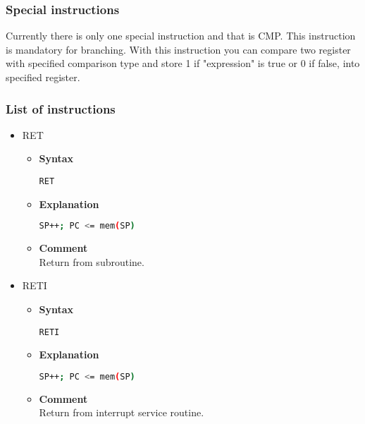 \subsubsection{Special instructions}

Currently there is only one special instruction and that is CMP. This
instruction is mandatory for branching. With this instruction you can compare
two register with specified comparison type and store 1 if "expression" is true
or 0 if false, into specified register.

\subsubsection{List of instructions}

\begin{itemize}

    \item RET
    \begin{itemize}
        \item \textbf{Syntax}
        \begin{lstlisting}[language={[x86masm]Assembler}, frame=single]
    RET
        \end{lstlisting}
        \item \textbf{Explanation}
        \begin{lstlisting}[language=bash, frame=single]
    SP++; PC <= mem(SP)
        \end{lstlisting}
        \item \textbf{Comment} \\
    Return from subroutine.
    \end{itemize}

    \item RETI
    \begin{itemize}
        \item \textbf{Syntax}
        \begin{lstlisting}[language={[x86masm]Assembler}, frame=single]
    RETI
        \end{lstlisting}
        \item \textbf{Explanation}
        \begin{lstlisting}[language=bash, frame=single]
    SP++; PC <= mem(SP)
        \end{lstlisting}
        \item \textbf{Comment} \\
    Return from interrupt service routine.
    \end{itemize}


\end{itemize}
